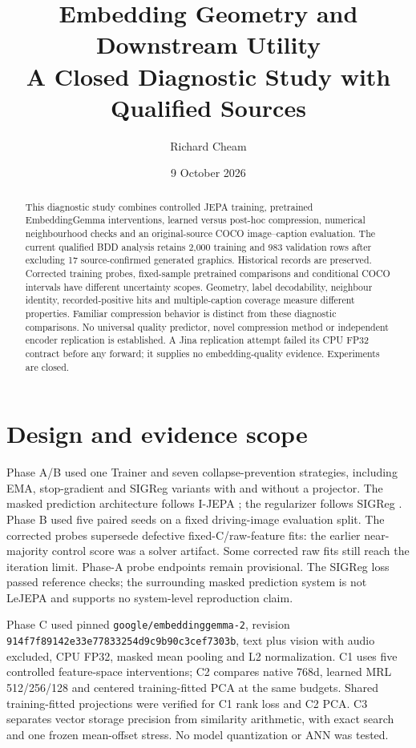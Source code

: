 \documentclass[11pt]{article}
\title{Embedding Geometry and Downstream Utility\\\large A Closed Diagnostic Study with Qualified Sources}
\author{Richard Cheam}
\date{9 October 2026}
\begin{document}
\maketitle
\begin{abstract}
\ours{} This diagnostic study combines controlled JEPA training, pretrained
EmbeddingGemma interventions, learned versus post-hoc compression, numerical
neighbourhood checks and an original-source COCO image--caption evaluation.
The current qualified BDD analysis retains 2,000 training and 983 validation
rows after excluding 17 source-confirmed generated graphics. Historical records
are preserved. Corrected training probes, fixed-sample pretrained comparisons
and conditional COCO intervals have different uncertainty scopes.
\interp{} Geometry, label decodability, neighbour identity, recorded-positive
hits and multiple-caption coverage measure different properties. Familiar
compression behavior is distinct from these diagnostic comparisons. No universal
quality predictor, novel compression method or independent encoder replication
is established. A Jina replication attempt failed its CPU FP32 contract before
any forward; it supplies no embedding-quality evidence. Experiments are closed.
\end{abstract}

\section{Design and evidence scope}
\ours{} Phase A/B used one Trainer and seven collapse-prevention strategies,
including EMA, stop-gradient and SIGReg variants with and without a projector.
The masked prediction architecture follows I-JEPA \citep{assran2023ijepa}; the
regularizer follows SIGReg \citep{lejepa2025}.
Phase B used five paired seeds on a fixed driving-image evaluation split.
The corrected probes supersede defective fixed-C/raw-feature fits: the earlier
near-majority control score was a solver artifact. Some corrected raw fits still
reach the iteration limit. Phase-A probe endpoints remain provisional.
\interp{} The SIGReg loss passed reference checks; the surrounding masked
prediction system is not LeJEPA and supports no system-level reproduction claim.

\ours{} Phase C used pinned \texttt{google/embeddinggemma-2}, revision
\texttt{914f7f89142e33e77833254d9c9b90c3cef7303b}, text plus vision with audio
excluded, CPU FP32, masked mean pooling and L2 normalization. C1 uses five
controlled feature-space interventions; C2 compares native 768d, learned MRL
512/256/128 and centered training-fitted PCA at the same budgets. Shared
training-fitted projections were verified for C1 rank loss and C2 PCA.
C3 separates vector storage precision from similarity arithmetic, with exact
search and one frozen mean-offset stress. No model quantization or ANN was tested.
\end{document}
